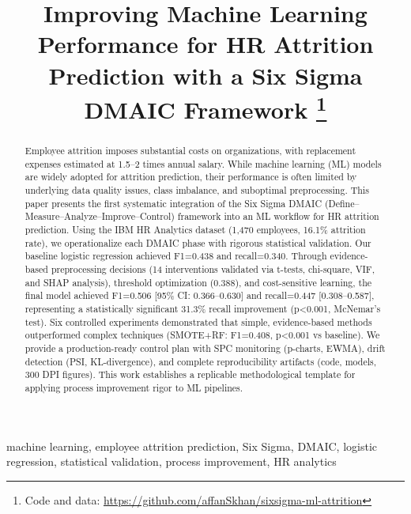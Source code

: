 \documentclass[conference]{IEEEtran}
\begin{document}
\title{Improving Machine Learning Performance for HR Attrition Prediction with a Six Sigma DMAIC Framework%
\thanks{Code and data: \url{https://github.com/affanSkhan/sixsigma-ml-attrition}}}

\author{
}

\maketitle

\begin{abstract}
Employee attrition imposes substantial costs on organizations, with replacement expenses estimated at 1.5--2 times annual salary. While machine learning (ML) models are widely adopted for attrition prediction, their performance is often limited by underlying data quality issues, class imbalance, and suboptimal preprocessing. This paper presents the first systematic integration of the Six Sigma DMAIC (Define--Measure--Analyze--Improve--Control) framework into an ML workflow for HR attrition prediction. Using the IBM HR Analytics dataset (1,470 employees, 16.1\% attrition rate), we operationalize each DMAIC phase with rigorous statistical validation. Our baseline logistic regression achieved F1=0.438 and recall=0.340. Through evidence-based preprocessing decisions (14 interventions validated via t-tests, chi-square, VIF, and SHAP analysis), threshold optimization (0.388), and cost-sensitive learning, the final model achieved F1=0.506 [95\% CI: 0.366--0.630] and recall=0.447 [0.308--0.587], representing a statistically significant 31.3\% recall improvement (p<0.001, McNemar's test). Six controlled experiments demonstrated that simple, evidence-based methods outperformed complex techniques (SMOTE+RF: F1=0.408, p<0.001 vs baseline). We provide a production-ready control plan with SPC monitoring (p-charts, EWMA), drift detection (PSI, KL-divergence), and complete reproducibility artifacts (code, models, 300 DPI figures). This work establishes a replicable methodological template for applying process improvement rigor to ML pipelines.
\end{abstract}

\begin{IEEEkeywords}
machine learning, employee attrition prediction, Six Sigma, DMAIC, logistic regression, statistical validation, process improvement, HR analytics
\end{IEEEkeywords}
\end{document}
